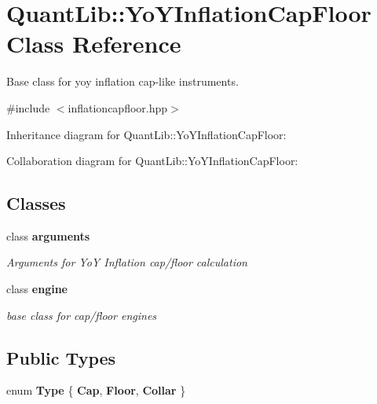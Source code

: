 \section{Quant\+Lib\+:\+:Yo\+Y\+Inflation\+Cap\+Floor Class Reference}
\label{class_quant_lib_1_1_yo_y_inflation_cap_floor}


Base class for yoy inflation cap-\/like instruments.  




{\ttfamily \#include $<$inflationcapfloor.\+hpp$>$}



Inheritance diagram for Quant\+Lib\+:\+:Yo\+Y\+Inflation\+Cap\+Floor\+:


Collaboration diagram for Quant\+Lib\+:\+:Yo\+Y\+Inflation\+Cap\+Floor\+:
\subsection*{Classes}
\begin{DoxyCompactItemize}
\item 
class {\bf arguments}
\begin{DoxyCompactList}\small\item\em Arguments for YoY Inflation cap/floor calculation \end{DoxyCompactList}\item 
class {\bf engine}
\begin{DoxyCompactList}\small\item\em base class for cap/floor engines \end{DoxyCompactList}\end{DoxyCompactItemize}
\subsection*{Public Types}
\begin{DoxyCompactItemize}
\item 
enum {\bfseries Type} \{ {\bfseries Cap}, 
{\bfseries Floor}, 
{\bfseries Collar}
 \}\label{class_quant_lib_1_1_yo_y_inflation_cap_floor_af28f0f172a2f11bf7a06b4779fe9f05a}

\end{DoxyCompactItemize}
